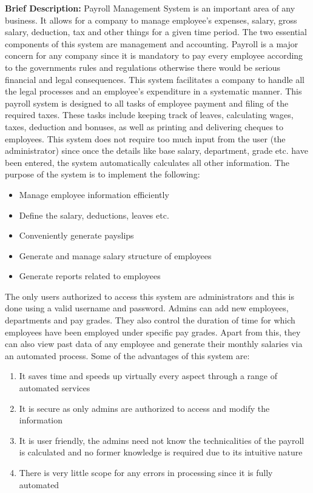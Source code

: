 \documentclass[12pt]{article}
\begin{document}
\noindent
\textbf{Brief Description:}
\newline
\newline
Payroll Management System is an important area of any business. It allows for a company to manage employee's expenses, salary, gross salary, deduction, tax and other things for a given time period. The two essential components of this system are management and accounting. Payroll is a major concern for any company since it is mandatory to pay every employee according to the governments rules and regulations otherwise there would be serious financial and legal consequences. This system facilitates a company to handle all the legal processes and an employee's expenditure in a systematic manner.
\newline
\newline
This payroll system is designed to all tasks of employee payment and filing of the required taxes. These tasks include keeping track of leaves, calculating wages, taxes, deduction and bonuses, as well as printing and delivering cheques to employees. This system does not require too much input from the user (the administrator) since once the details like base salary, department, grade etc. have been entered, the system automatically calculates all other information.
\newline
\newline
The purpose of the system is to implement the following:
\begin{itemize}
    \item Manage employee information efficiently
    \item Define the salary, deductions, leaves etc.
    \item Conveniently generate payslips
    \item Generate and manage salary structure of employees
    \item Generate reports related to employees
\end{itemize}
\noindent
The only users authorized to access this system are administrators and this is done using a valid username and password. Admins can add new employees, departments and pay grades. They also control the duration of time for which employees have been employed under specific pay grades. Apart from this, they can also view past data of any employee and generate their monthly salaries via an automated process.
\newline
\newline
\noindent
Some of the advantages of this system are:
\begin{enumerate}
    \item It saves time and speeds up virtually every aspect through a range of automated services
    \item It is secure as only admins are authorized to access and modify the information
    \item It is user friendly, the admins need not know the technicalities of the payroll is calculated and no former knowledge is required due to its intuitive nature
    \item There is very little scope for any errors in processing since it is fully automated
\end{enumerate}
\end{document}
